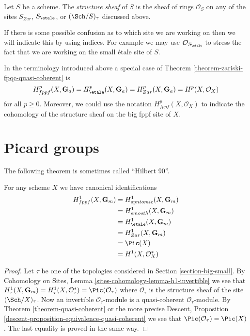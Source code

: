 \begin{definition}
\label{definition-structure-sheaf}
Let $S$ be a scheme. The {\it structure sheaf} of $S$ is the sheaf of rings
$\mathcal{O}_S$
on any of the sites $S_{Zar}$, $S_\etale$, or $(\Sch/S)_\tau$
discussed above.
\end{definition}

\noindent
If there is some possible confusion as to which site we are working on
then we will indicate this by using indices. For example we may use
$\mathcal{O}_{S_\etale}$ to stress the fact that we are working on the
small \'etale site of $S$.

\begin{remark}
\label{remark-special-case-fpqc-cohomology-quasi-coherent}
In the terminology introduced above a special case of
Theorem \ref{theorem-zariski-fpqc-quasi-coherent}
is
$$
H_{fppf}^p(X, \mathbf{G}_a) =
H_\etale^p(X, \mathbf{G}_a) =
H_{Zar}^p(X, \mathbf{G}_a) =
H^p(X, \mathcal{O}_X)
$$
for all $p \geq 0$. Moreover, we could use the notation
$H^p_{fppf}(X, \mathcal{O}_X)$ to indicate the cohomology of the
structure sheaf on the big fppf site of $X$.
\end{remark}




\section{Picard groups}
\label{section-picard-groups}

\noindent
The following theorem is sometimes called ``Hilbert 90''.

\begin{theorem}
\label{theorem-picard-group}
For any scheme $X$ we have canonical identifications
\begin{align*}
H_{fppf}^1(X, \mathbf{G}_m) & = H^1_{syntomic}(X, \mathbf{G}_m) \\
& = H^1_{smooth}(X, \mathbf{G}_m) \\
& = H_\etale^1(X, \mathbf{G}_m) \\
& = H^1_{Zar}(X, \mathbf{G}_m) \\
& = \Pic(X) \\
& = H^1(X, \mathcal{O}_X^*)
\end{align*}
\end{theorem}

\begin{proof}
Let $\tau$ be one of the topologies considered in
Section \ref{section-big-small}.
By
Cohomology on Sites, Lemma
\ref{sites-cohomology-lemma-h1-invertible}
we see that
$H^1_\tau(X, \mathbf{G}_m) =
H^1_\tau(X, \mathcal{O}_\tau^*) =
\Pic(\mathcal{O}_\tau)$
where $\mathcal{O}_\tau$ is the structure sheaf of the site
$(\Sch/X)_\tau$. Now an invertible $\mathcal{O}_\tau$-module
is a quasi-coherent $\mathcal{O}_\tau$-module.
By Theorem \ref{theorem-quasi-coherent} or the more precise
Descent, Proposition \ref{descent-proposition-equivalence-quasi-coherent}
we see that $\Pic(\mathcal{O}_\tau) = \Pic(X)$.
The last equality is proved in the same way.
\end{proof}







